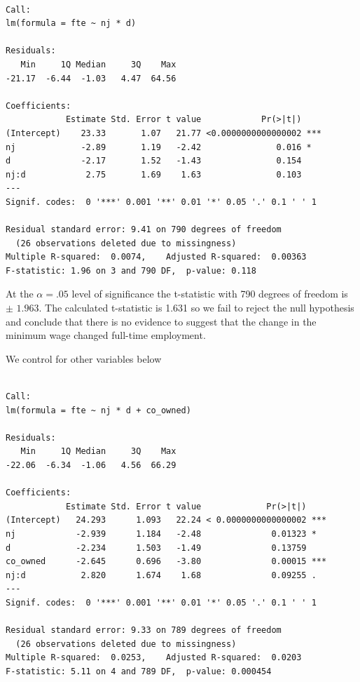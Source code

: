 \documentclass[]{book}
\newenvironment{Shaded}{\begin{snugshade}}{\end{snugshade}}
\newcommand{\KeywordTok}[1]{\textcolor[rgb]{0.13,0.29,0.53}{\textbf{#1}}}
\newcommand{\NormalTok}[1]{#1}
\newcommand{\OperatorTok}[1]{\textcolor[rgb]{0.81,0.36,0.00}{\textbf{#1}}}
\newcommand{\StringTok}[1]{\textcolor[rgb]{0.31,0.60,0.02}{#1}}
\begin{document}
\begin{verbatim}

Call:
lm(formula = fte ~ nj * d)

Residuals:
   Min     1Q Median     3Q    Max 
-21.17  -6.44  -1.03   4.47  64.56 

Coefficients:
            Estimate Std. Error t value            Pr(>|t|)    
(Intercept)    23.33       1.07   21.77 <0.0000000000000002 ***
nj             -2.89       1.19   -2.42               0.016 *  
d              -2.17       1.52   -1.43               0.154    
nj:d            2.75       1.69    1.63               0.103    
---
Signif. codes:  0 '***' 0.001 '**' 0.01 '*' 0.05 '.' 0.1 ' ' 1

Residual standard error: 9.41 on 790 degrees of freedom
  (26 observations deleted due to missingness)
Multiple R-squared:  0.0074,    Adjusted R-squared:  0.00363 
F-statistic: 1.96 on 3 and 790 DF,  p-value: 0.118
\end{verbatim}

At the \(\alpha=.05\) level of significance the t-statistic with 790 degrees of freedom is \(\pm\) \(1.963\). The calculated t-statistic is 1.631 so we fail to reject the null hypothesis and conclude that there is no evidence to suggest that the change in the minimum wage changed full-time employment.

We control for other variables below

\begin{Shaded}
\end{Shaded}

\begin{verbatim}

Call:
lm(formula = fte ~ nj * d + co_owned)

Residuals:
   Min     1Q Median     3Q    Max 
-22.06  -6.34  -1.06   4.56  66.29 

Coefficients:
            Estimate Std. Error t value             Pr(>|t|)    
(Intercept)   24.293      1.093   22.24 < 0.0000000000000002 ***
nj            -2.939      1.184   -2.48              0.01323 *  
d             -2.234      1.503   -1.49              0.13759    
co_owned      -2.645      0.696   -3.80              0.00015 ***
nj:d           2.820      1.674    1.68              0.09255 .  
---
Signif. codes:  0 '***' 0.001 '**' 0.01 '*' 0.05 '.' 0.1 ' ' 1

Residual standard error: 9.33 on 789 degrees of freedom
  (26 observations deleted due to missingness)
Multiple R-squared:  0.0253,    Adjusted R-squared:  0.0203 
F-statistic: 5.11 on 4 and 789 DF,  p-value: 0.000454
\end{verbatim}
\end{document}
